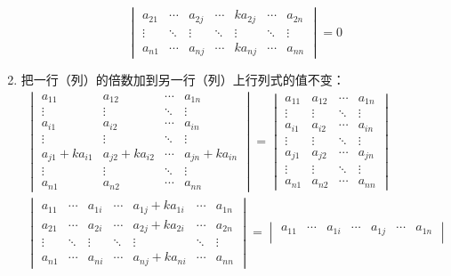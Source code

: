 \begin{property}
\begin{enumerate}
\begin{equation*}
\begin{vmatrix}
			a_{21} & \cdots & a_{2j} & \cdots & ka_{2j} & \cdots & a_{2n} \\
			\vdots & \ddots & \vdots & \ddots & \vdots & \ddots & \vdots \\
			a_{n1} & \cdots & a_{nj} & \cdots & ka_{nj} & \cdots & a_{nn}
			\end{vmatrix}=0
		\end{equation*}
		\item 把一行（列）的倍数加到另一行（列）上行列式的值不变：
		\begin{gather*}
			\begin{vmatrix}
				a_{11} & a_{12} & \cdots & a_{1n} \\
				\vdots & \vdots & \ddots & \vdots \\
				a_{i1} & a_{i2} & \cdots & a_{in} \\
				\vdots & \vdots & \ddots & \vdots \\
				a_{j1}+ka_{i1} & a_{j2}+ka_{i2} & \cdots & a_{jn}+ka_{in} \\
				\vdots & \vdots & \ddots & \vdots \\
				a_{n1} & a_{n2} & \cdots & a_{nn}
			\end{vmatrix}=
			\begin{vmatrix}
				a_{11} & a_{12} & \cdots & a_{1n} \\
				\vdots & \vdots & \ddots & \vdots \\
				a_{i1} & a_{i2} & \cdots & a_{in} \\
				\vdots & \vdots & \ddots & \vdots \\
				a_{j1} & a_{j2} & \cdots & a_{jn} \\
				\vdots & \vdots & \ddots & \vdots \\
				a_{n1} & a_{n2} & \cdots & a_{nn}
			\end{vmatrix} \\
			\begin{vmatrix}
				a_{11} & \cdots & a_{1i} & \cdots & a_{1j}+ka_{1i} & \cdots & a_{1n} \\
				a_{21} & \cdots & a_{2i} & \cdots & a_{2j}+ka_{2i} & \cdots & a_{2n} \\
				\vdots & \ddots & \vdots & \ddots & \vdots & \ddots & \vdots \\
				a_{n1} & \cdots & a_{ni} & \cdots & a_{nj}+ka_{ni}  & \cdots & a_{nn}
			\end{vmatrix}=
			\begin{vmatrix}
				a_{11} & \cdots & a_{1i} & \cdots & a_{1j} & \cdots & a_{1n} \\

\end{vmatrix}
\end{gather*}
\end{enumerate}
\end{property}
